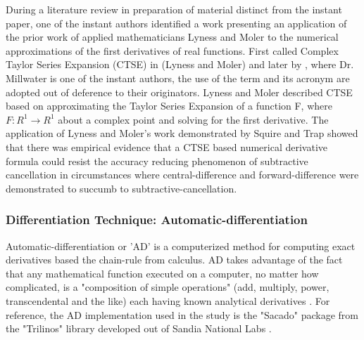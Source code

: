 \documentclass[preprint,12pt]{elsarticle}
\begin{document}
During a literature review in preparation of material distinct from the instant paper, one of the
instant authors identified a work presenting an application of the prior work of applied
mathematicians Lyness and Moler to the numerical approximations of the first derivatives of real
functions. First called Complex Taylor Series Expansion (CTSE) in (Lyness and Moler) and later by
\cite{voorhees2011complex}, where Dr. Millwater is one of the  instant authors, the use of the term and
its acronym are adopted out of deference to their  originators. Lyness and Moler described CTSE
based on  approximating the Taylor Series Expansion of a function F, where $F:R^1 \rightarrow R^1$  about a
complex point and solving for the first derivative. The application of Lyness and Moler's work
demonstrated by Squire and Trap showed that there was empirical evidence that a CTSE based numerical
derivative formula could resist the accuracy reducing phenomenon of subtractive cancellation in
circumstances where central-difference and forward-difference were  demonstrated to succumb to
subtractive-cancellation.       
 

\subsubsection{Differentiation Technique: Automatic-differentiation} 
\label{ADsubsection}

Automatic-differentiation or 'AD' is a computerized method for computing exact derivatives based the
chain-rule from calculus. AD takes advantage of the fact that any
mathematical function executed on a computer, no matter how complicated, is a "composition of simple
operations" (add, multiply, power, transcendental and the like) each having known analytical derivatives
\cite{ref-sacado-presentation}. For reference, the AD
implementation used in the study is the "Sacado" package from the "Trilinos" library developed out of Sandia
National Labs \cite{ref-Sacado}.
\end{document}
